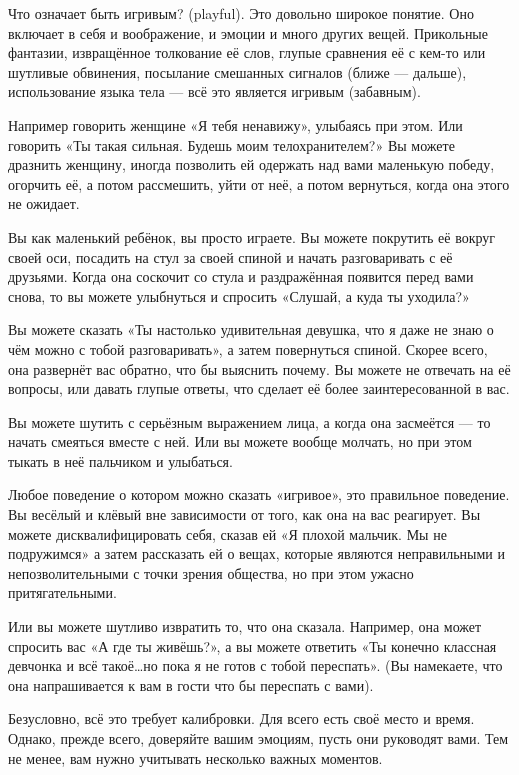 Что означает быть игривым? (playful). Это довольно широкое понятие. Оно включает в себя и воображение, и эмоции и много других вещей. Прикольные фантазии, извращённое толкование её слов, глупые сравнения её с кем-то или шутливые обвинения, посылание смешанных сигналов (ближе --- дальше), использование языка тела --- всё это является игривым (забавным).

Например говорить женщине «Я тебя ненавижу», улыбаясь при этом. Или говорить «Ты такая сильная. Будешь моим телохранителем?» Вы можете дразнить женщину, иногда позволить ей одержать над вами маленькую победу, огорчить её, а потом рассмешить, уйти от неё, а потом вернуться, когда она этого не ожидает.

Вы как маленький ребёнок, вы просто играете. Вы можете покрутить её вокруг своей оси, посадить на стул за своей спиной и начать разговаривать с её друзьями. Когда она соскочит со стула и раздражённая появится перед вами снова, то вы можете улыбнуться и спросить «Слушай, а куда ты уходила?»

Вы можете сказать «Ты настолько удивительная девушка, что я даже не знаю о чём можно с тобой разговаривать», а затем повернуться спиной. Скорее всего, она развернёт вас обратно, что бы выяснить почему. Вы можете не отвечать на её вопросы, или давать глупые ответы, что сделает её более заинтересованной в вас.

Вы можете шутить с серьёзным выражением лица, а когда она засмеётся --- то начать смеяться вместе с ней. Или вы можете вообще молчать, но при этом тыкать в неё пальчиком и улыбаться.

Любое поведение о котором можно сказать «игривое», это правильное поведение. Вы весёлый и клёвый вне зависимости от того, как она на вас реагирует. Вы можете дисквалифицировать себя, сказав ей «Я плохой мальчик. Мы не подружимся» а затем рассказать ей о вещах, которые являются неправильными и непозволительными с точки зрения общества, но при этом ужасно притягательными.

Или вы можете шутливо извратить то, что она сказала. Например, она может спросить вас «А где ты живёшь?», а вы можете ответить «Ты конечно классная девчонка и всё такоё\ldots но пока я не готов с тобой переспать». (Вы намекаете, что она напрашивается к вам в гости что бы переспать с вами).

Безусловно, всё это требует калибровки. Для всего есть своё место и время. Однако, прежде всего, доверяйте вашим эмоциям, пусть они руководят вами. Тем не менее, вам нужно учитывать несколько важных моментов.

